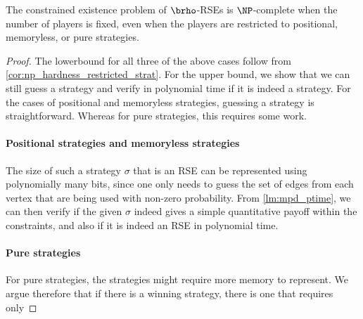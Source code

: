 \begin{theorem}\label{thm:infinite_rho_restricted_strategy_np_easy}
    The constrained existence problem of $\brho$-RSEs is $\NP$-complete
    when the number of players is fixed, even when the players are restricted to positional, memoryless,  or pure strategies. 
\end{theorem}
\begin{proof}
    The lowerbound for all three of the above cases follow from \cref{cor:np_hardness_restricted_strat}. 
    For the upper bound, we show that we can still guess a strategy and verify in polynomial time if it is indeed a strategy. For the cases of positional and memoryless strategies, guessing a strategy is straightforward. Whereas for pure strategies, this requires some work. 
    \paragraph*{Positional strategies and memoryless strategies} The size of such a strategy $\sigma$ that is an RSE can be represented using polynomially many bits, since one only needs to guess the set of edges from each vertex that are being used with non-zero probability. From \cref{lm:mpd_ptime}, we can then verify if the given $\sigma$ indeed gives a simple quantitative payoff within the constraints, and also if it is indeed an RSE in polynomial time. 

    \paragraph*{Pure strategies}
    For pure strategies, the strategies might require more memory to represent. We argue therefore that if there is a winning strategy, there is one that requires only 
\end{proof}